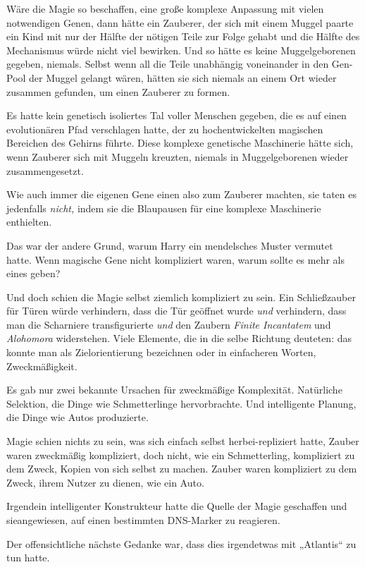 {Wäre die Magie so beschaffen, eine große komplexe Anpassung mit vielen notwendigen Genen, dann hätte ein Zauberer, der sich mit einem Muggel paarte ein Kind mit nur der Hälfte der nötigen Teile zur Folge gehabt und die Hälfte des Mechanismus würde nicht viel bewirken. Und so hätte es keine Muggelgeborenen gegeben, niemals. Selbst wenn all die Teile unabhängig voneinander in den Gen-Pool der Muggel gelangt wären, hätten sie sich niemals an einem Ort wieder zusammen gefunden, um einen Zauberer zu formen.

Es hatte kein genetisch isoliertes Tal voller Menschen gegeben, die es auf einen evolutionären Pfad verschlagen hatte, der zu hochentwickelten magischen Bereichen des Gehirns führte. Diese komplexe genetische Maschinerie hätte sich, wenn Zauberer sich mit Muggeln kreuzten, niemals in Muggelgeborenen wieder zusammengesetzt.

Wie auch immer die eigenen Gene einen also zum Zauberer machten, sie taten es jedenfalls \emph{nicht,} indem sie die Blaupausen für eine komplexe Maschinerie enthielten.

Das war der andere Grund, warum Harry ein mendelsches Muster vermutet hatte. Wenn magische Gene nicht kompliziert waren, warum sollte es mehr als eines geben?

Und doch schien die Magie selbst ziemlich kompliziert zu sein. Ein Schließzauber für Türen würde verhindern, dass die Tür geöffnet wurde \emph{und} verhindern, dass man die Scharniere transfigurierte \emph{und} den Zaubern \emph{Finite Incantatem} und \emph{Alohomora} widerstehen. Viele Elemente, die in die selbe Richtung deuteten: das konnte man als Zielorientierung bezeichnen oder in einfacheren Worten, Zweckmäßigkeit.

Es gab nur zwei bekannte Ursachen für zweckmäßige Komplexität. Natürliche Selektion, die Dinge wie Schmetterlinge hervorbrachte. Und intelligente Planung, die Dinge wie Autos produzierte.

Magie schien nichts zu sein, was sich einfach selbst herbei-repliziert hatte, Zauber waren zweckmäßig kompliziert, doch nicht, wie ein Schmetterling, kompliziert zu dem Zweck, Kopien von sich selbst zu machen. Zauber waren kompliziert zu dem Zweck, ihrem Nutzer zu dienen, wie ein Auto.

Irgendein intelligenter Konstrukteur hatte die Quelle der Magie geschaffen und sieangewiesen, auf einen bestimmten DNS-Marker zu reagieren.

Der offensichtliche nächste Gedanke war, dass dies irgendetwas mit „Atlantis“ zu tun hatte.

}
